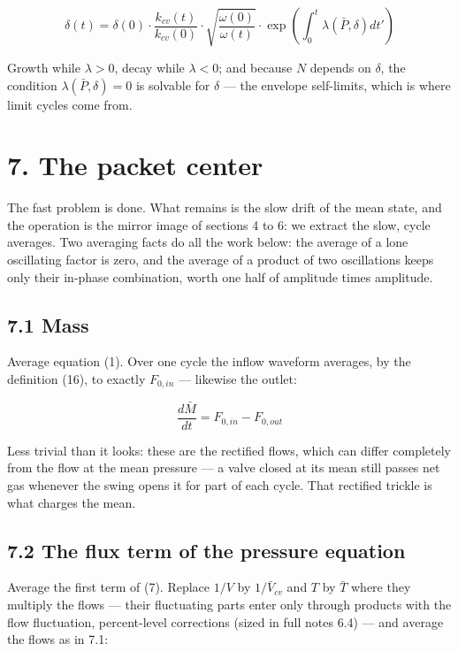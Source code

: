 \documentclass[11pt]{article}
\begin{document}
\begin{equation}
\delta(t) = \delta(0)\cdot\frac{k_{cv}(t)}{k_{cv}(0)}\cdot\sqrt{\frac{\omega(0)}{\omega(t)}}\cdot\exp\left(\int_0^t\lambda(\bar P,\delta)dt'\right) \tag{22}
\end{equation}

Growth while $\lambda > 0$, decay while $\lambda < 0$; and because $N$ depends on $\delta$, the condition $\lambda(\bar P, \delta) = 0$ is solvable for $\delta$ --- the envelope self-limits, which is where limit cycles come from.

\section*{7. The packet center}

The fast problem is done. What remains is the slow drift of the mean state, and the operation is the mirror image of sections 4 to 6: we extract the slow, cycle averages. Two averaging facts do all the work below: the average of a lone oscillating factor is zero, and the average of a product of two oscillations keeps only their in-phase combination, worth one half of amplitude times amplitude.

\subsection*{7.1 Mass}

Average equation (1). Over one cycle the inflow waveform averages, by the definition (16), to exactly $F_{0,in}$ --- likewise the outlet:

\begin{equation}
\frac{d\bar M}{dt} = F_{0,in} - F_{0,out} \tag{23}
\end{equation}

Less trivial than it looks: these are the rectified flows, which can differ completely from the flow at the mean pressure --- a valve closed at its mean still passes net gas whenever the swing opens it for part of each cycle. That rectified trickle is what charges the mean.

\subsection*{7.2 The flux term of the pressure equation}

Average the first term of (7). Replace $1/V$ by $1/\bar V_{cv}$ and $T$ by $\bar T$ where they multiply the flows --- their fluctuating parts enter only through products with the flow fluctuation, percent-level corrections (sized in full notes 6.4) --- and average the flows as in 7.1:
\end{document}

